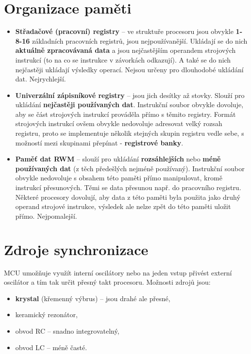 \section{Organizace paměti}
\begin{itemize}
    \item \textbf{Střadačové (pracovní) registry }-- ve struktuře procesoru jsou obvykle \textbf{1-8-16} základních pracovních registrů, jsou nejpoužívanější. Ukládají se do nich \textbf{aktuálně zpracovávaná data} a jsou nejčastějším operandem strojových instrukcí (to na co se instrukce v závorkách odkazují). A také se do nich nejčastěji ukládají výsledky operací. Nejsou určeny pro dlouhodobé ukládání dat. Nejrychlejší.
    \item \textbf{Univerzální zápisníkové registry} -- jsou jich desítky až stovky. Slouží pro ukládání \textbf{nejčastěji používaných dat}. Instrukční soubor obvykle dovoluje, aby se část strojových instrukcí prováděla přímo s těmito registry. Formát strojových instrukcí ovšem obvykle nedovoluje adresovat velký rozsah registru, proto se implementuje několik stejných skupin registru vedle sebe, s možností mezi skupinami přepínat - \textbf{registrové banky}.
    \item \textbf{Paměť dat RWM} -- slouží pro ukládání \textbf{rozsáhlejších} nebo \textbf{méně používaných dat} (z těch předešlých nejméně používaný). Instrukční soubor obvykle nedovoluje s obsahem této paměti přímo manipulovat, kromě instrukcí přesunových. Těmi se data přesunou např. do pracovního registru. Některé procesory dovolují, aby data z této paměti byla použita jako druhý operand strojové instrukce, výsledek ale nelze zpět do této paměti uložit přímo. Nejpomalejší.
\end{itemize}

\section{Zdroje synchronizace}
MCU umožňuje využít interní oscilátory nebo na jeden vstup přivést externí oscilátor a tím tak určit přesný takt procesoru. Možnosti zdrojů jsou:
\begin{itemize}
    \item \textbf{krystal} (křemenný výbrus) – jsou drahé ale přesné,
    \item keramický rezonátor,
    \item obvod RC -- snadno integrovatelný,
    \item obvod LC -- méně časté.
\end{itemize}

